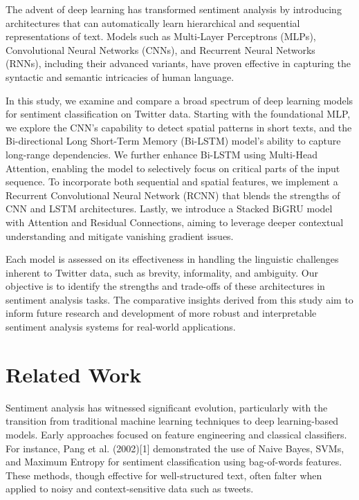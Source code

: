 \documentclass{article}
\begin{document}
The advent of deep learning has transformed sentiment analysis by introducing architectures that can automatically learn hierarchical and sequential representations of text. Models such as Multi-Layer Perceptrons (MLPs), Convolutional Neural Networks (CNNs), and Recurrent Neural Networks (RNNs), including their advanced variants, have proven effective in capturing the syntactic and semantic intricacies of human language.

In this study, we examine and compare a broad spectrum of deep learning models for sentiment classification on Twitter data. Starting with the foundational MLP, we explore the CNN’s capability to detect spatial patterns in short texts, and the Bi-directional Long Short-Term Memory (Bi-LSTM) model’s ability to capture long-range dependencies. We further enhance Bi-LSTM using Multi-Head Attention, enabling the model to selectively focus on critical parts of the input sequence. To incorporate both sequential and spatial features, we implement a Recurrent Convolutional Neural Network (RCNN) that blends the strengths of CNN and LSTM architectures. Lastly, we introduce a Stacked BiGRU model with Attention and Residual Connections, aiming to leverage deeper contextual understanding and mitigate vanishing gradient issues.

Each model is assessed on its effectiveness in handling the linguistic challenges inherent to Twitter data, such as brevity, informality, and ambiguity. Our objective is to identify the strengths and trade-offs of these architectures in sentiment analysis tasks. The comparative insights derived from this study aim to inform future research and development of more robust and interpretable sentiment analysis systems for real-world applications.

\section{Related Work}

Sentiment analysis has witnessed significant evolution, particularly with the transition from traditional machine learning techniques to deep learning-based models. Early approaches focused on feature engineering and classical classifiers. For instance, Pang et al. (2002)[1] demonstrated the use of Naive Bayes, SVMs, and Maximum Entropy for sentiment classification using bag-of-words features. These methods, though effective for well-structured text, often falter when applied to noisy and context-sensitive data such as tweets.
\end{document}
